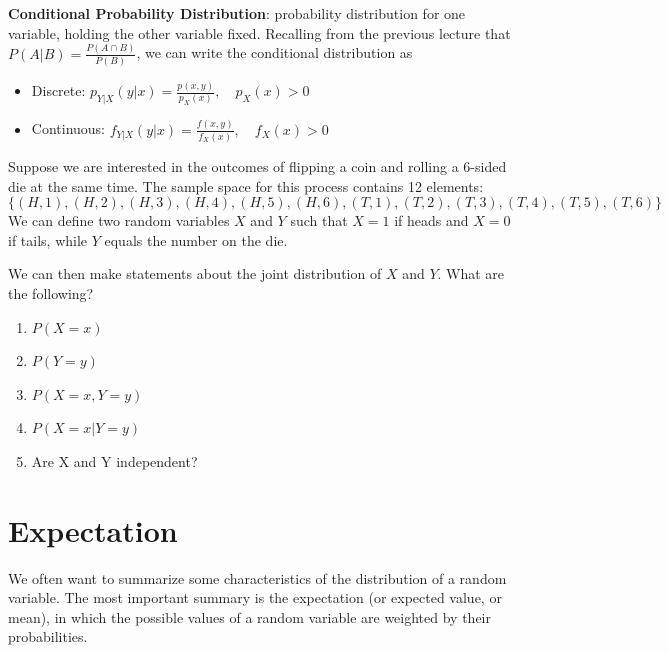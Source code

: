 \documentclass[
]{book}
\begin{document}
\textbf{Conditional Probability Distribution}: probability distribution for one variable, holding the other variable fixed. Recalling from the previous lecture that \(P(A|B)=\frac{P(A\cap B)}{P(B)}\), we can write the conditional distribution as

\begin{itemize}
\tightlist
\item
  Discrete: \(p_{Y|X}(y|x) = \frac{p(x,y)}{p_X(x)}, \quad p_X(x) > 0\)
\item
  Continuous: \(f_{Y|X}(y|x) = \frac{f(x,y)}{f_X(x)},\quad f_X(x) > 0\)
\end{itemize}

\begin{exercise}
\protect\hypertarget{exr:unnamed-chunk-82}{}\label{exr:unnamed-chunk-82}

Suppose we are interested in the outcomes of flipping a coin and rolling a 6-sided die at the same time. The sample space for this process contains 12 elements: \[\{(H, 1), (H, 2), (H, 3), (H, 4), (H, 5), (H, 6), (T, 1), (T, 2), (T, 3), (T, 4), (T, 5), (T, 6)\}\] We can define two random variables \(X\) and \(Y\) such that \(X = 1\) if heads and \(X = 0\) if tails, while \(Y\) equals the number on the die.

We can then make statements about the joint distribution of \(X\) and \(Y\). What are the following?

\begin{enumerate}
\def\labelenumi{\arabic{enumi}.}
\tightlist
\item
  \(P(X=x)\)
\item
  \(P(Y=y)\)
\item
  \(P(X=x, Y=y)\)
\item
  \(P(X=x|Y=y)\)
\item
  Are X and Y independent?
\end{enumerate}

\end{exercise}

\hypertarget{expectation}{%
\section{Expectation}\label{expectation}}

We often want to summarize some characteristics of the distribution of a random variable. The most important summary is the expectation (or expected value, or mean), in which the possible values of a random variable are weighted by their probabilities.
\end{document}
